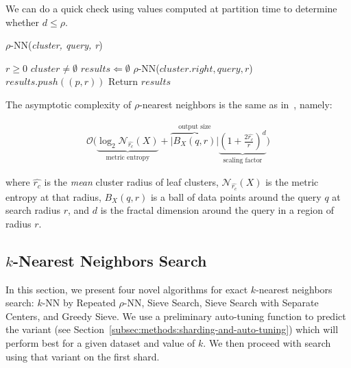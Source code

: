 We can do a quick check using values computed at partition time to determine whether $d \leq \rho$. 

\begin{algorithm} 
    \caption{$\rho$-NN(\emph{cluster, query, r})} 
    \label{alg:methods:rnn-search} 
    \begin{algorithmic}
        \REQUIRE $r \geq 0$
        \REQUIRE $cluster \neq \emptyset$
        \STATE $results \Leftarrow \emptyset$
            \ENDIF
        \ENDIF
                \STATE $\rho$-NN($cluster.right, query, r$)
            \ENDIF
        \ENDIF
                    \STATE $results.push((p, r))$
                \ENDIF
            \ENDFOR
        \ENDIF
        \STATE Return $results$
    \end{algorithmic}
\end{algorithm}

The asymptotic complexity of $\rho$-nearest neighbors is the same as in~\cite{ishaq2019clustered}, namely:

\begin{gather}
    \mathcal{O}\Bigg(
    \underbrace{\log_2 \mathcal{N}_{\hat{r_c}}(X)}_{\textrm{metric entropy}} +
    \overbrace{\left|B_X(q,r)\right|}^{\textrm{output size}}
    \underbrace{\left(1+\frac{2\hat{r_c}}{r}\right)^d}_{\textrm{scaling factor}}\Bigg)
    \label{hierarchical-complexity}
\end{gather}

where $\hat{r_c}$ is the \textit{mean} cluster radius of leaf clusters, $\mathcal{N}_{\hat{r_c}}(X)$ is the metric entropy at that radius, $B_X(q,r)$ is a ball of data points around the query $q$ at search radius $r$, and $d$ is the fractal dimension around the query in a region of radius $r$.


\subsection{\texorpdfstring{$k$}{k}-Nearest Neighbors Search}
\label{subsec:methods:knn-search}

In this section, we present four novel algorithms for exact $k$-nearest neighbors search: $k$-NN by Repeated $\rho$-NN, Sieve Search, Sieve Search with Separate Centers, and Greedy Sieve. 
We use a preliminary auto-tuning function to predict the variant (see Section~\ref{subsec:methods:sharding-and-auto-tuning}) which will perform 
best for a given dataset and value of $k$.
We then proceed with search using that variant on the first shard. 

